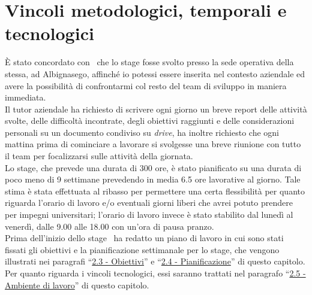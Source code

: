 \section{Vincoli metodologici, temporali e tecnologici}
È stato concordato con \TS\ che lo stage fosse svolto presso la sede operativa della stessa, ad Albignasego, affinché io potessi essere inserita nel contesto aziendale ed avere la possibilità di confrontarmi col resto del team di sviluppo in maniera immediata. \\
Il tutor aziendale ha richiesto di scrivere ogni giorno un breve report delle attività svolte, delle difficoltà incontrate, degli obiettivi raggiunti e delle considerazioni personali su un documento condiviso su \emph{\gls{drive}}\glsfirstoccur, ha inoltre richiesto che ogni mattina prima di cominciare a lavorare si svolgesse una breve riunione con tutto il team per focalizzarsi sulle attività della giornata.\\
Lo stage, che prevede una durata di 300 ore, è stato pianificato su una durata di poco meno di 9 settimane prevedendo in media 6.5 ore lavorative al giorno. Tale stima è stata effettuata al ribasso per permettere una certa flessibilità per quanto riguarda l'orario di lavoro e/o eventuali giorni liberi che avrei potuto prendere per impegni universitari; l'orario di lavoro invece è stato stabilito dal lunedì al venerdì, dalle 9.00 alle 18.00 con un'ora di pausa pranzo. \\
Prima dell'inizio dello stage \TS\ ha redatto un piano di lavoro in cui sono stati fissati gli obiettivi e la pianificazione settimanale per lo stage, che vengono illustrati nei paragrafi ``\hyperref[duetre]{2.3 - Obiettivi}'' e ``\hyperref[duequattro]{2.4 - Pianificazione}'' di questo capitolo. \\
Per quanto riguarda i vincoli tecnologici, essi saranno trattati nel paragrafo ``\hyperref[duecinque]{2.5 - Ambiente di lavoro}'' di questo capitolo.
